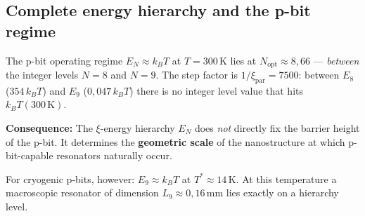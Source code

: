 	\subsection{Complete energy hierarchy and the p-bit regime}
	\label{subsec:energy-table}
	
	\begin{center}
	\end{center}
	
	\begin{important}
		The p-bit operating regime $E_N \approx k_B T$ at $T = 300\,\text{K}$
		lies at $N_\text{opt} \approx 8{,}66$ --- \emph{between} the
		integer levels $N=8$ and $N=9$. The step factor is
		$1/\xi_\text{par} = 7500$: between $E_8$ ($354\,k_BT$) and
		$E_9$ ($0{,}047\,k_BT$) there is no integer level value
		that hits $k_BT(300\,\text{K})$.
		
		\textbf{Consequence:} The $\xi$-energy hierarchy $E_N$ does
		\emph{not} directly fix the barrier height of the p-bit. It determines
		the \textbf{geometric scale} of the nanostructure at which
		p-bit-capable resonators naturally occur.
		
		For cryogenic p-bits, however: $E_9 \approx k_BT$ at
		$T^* \approx 14\,\text{K}$. At this temperature a macroscopic
		resonator of dimension $L_9 \approx 0{,}16\,\text{mm}$
		lies exactly on a hierarchy level.
	\end{important}
	
